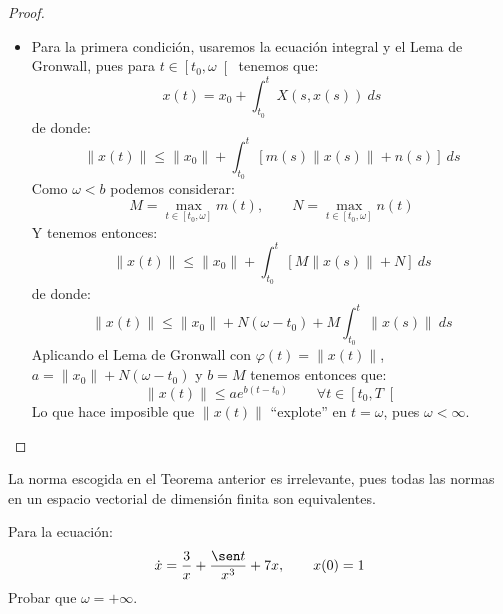 \begin{teo}
\begin{proof}
\begin{itemize}
            \item Para la primera condición, usaremos la ecuación integral y el Lema de Gronwall, pues para $t\in \left[t_0,\omega\right[$ tenemos que:
                    \begin{equation*}
                        x(t) = x_0 + \int_{t_0}^{t} X(s,x(s))~ds 
                    \end{equation*}
                    de donde:
                    \begin{equation*}
                        \|x(t)\| \leq \|x_0\| + \int_{t_0}^{t} [m(s)\|x(s)\| + n(s)]~ds 
                    \end{equation*}
                    Como $\omega < b$ podemos considerar:
                    \begin{equation*}
                        M = \max_{t\in [t_0,\omega]} m(t), \qquad N = \max_{t\in [t_0,\omega]} n(t)
                    \end{equation*}
                    Y tenemos entonces:
                    \begin{equation*}
                        \|x(t)\| \leq \|x_0\| + \int_{t_0}^{t} [M\|x(s)\| + N]~ds 
                    \end{equation*}
                    de donde:
                    \begin{equation*}
                        \|x(t)\| \leq \|x_0\| + N(\omega - t_0) + M\int_{t_0}^{t} \|x(s)\|~ds 
                    \end{equation*}
                    Aplicando el Lema de Gronwall con $\varphi(t) = \|x(t)\|$, $a=\|x_0\| + N(\omega-t_0)$ y $b=M$ tenemos entonces que:
                    \begin{equation*}
                        \|x(t)\| \leq ae^{b(t-t_0)} \qquad \forall t\in \left[t_0,T\right[
                    \end{equation*}
                    Lo que hace imposible que $\|x(t)\|$ ``explote'' en $t=\omega$, pues $\omega<\infty$.
        \end{itemize}
    \end{proof}
\end{teo}

\begin{observacion}
    La norma escogida en el Teorema anterior es irrelevante, pues todas las normas en un espacio vectorial de dimensión finita son equivalentes.
\end{observacion}

\begin{ejercicio}
    Para la ecuación:
    \begin{equation*}
        \dot{x} = \frac{3}{x} + \frac{\sen t}{x^3} + 7x, \qquad x(0) = 1
    \end{equation*}
    Probar que $\omega = +\infty$.
\end{ejercicio}

